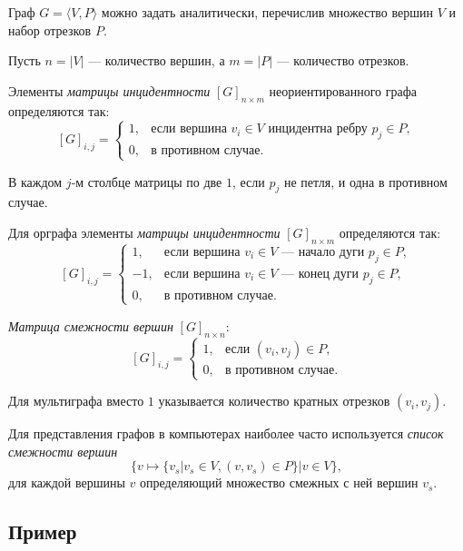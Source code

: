 Граф $G=\langle V,P\rangle$ можно задать аналитически, перечислив множество вершин $V$ и набор отрезков $P$.

Пусть $n=|V|$ --- количество вершин, а $m=|P|$ --- количество отрезков. 

Элементы \emph{матрицы инцидентности} $[G]_{n\times m}$ неориентированного графа определяются так:
\[
    [G]_{i,j}=
    \begin{cases}
        1, &\text{если вершина $v_i\in V$ инцидентна ребру $p_j\in P$},\\
        0, &\text{в противном случае.}
    \end{cases}
\]

В каждом $j$-м столбце матрицы по две $1$, если $p_j$ не петля, и одна в противном случае. 

Для орграфа элементы \emph{матрицы инцидентности} $[G]_{n\times m}$ определяются так:
\[
    [G]_{i,j}=
    \begin{cases}
         1, &\text{если вершина $v_i\in V$ --- начало дуги $p_j\in P$},\\
        -1, &\text{если вершина $v_i\in V$ --- конец дуги $p_j\in P$},\\
         0, &\text{в противном случае.}
    \end{cases}
\]

\emph{Матрица смежности вершин} $[G]_{n\times n}$:
\[
    [G]_{i,j}=
    \begin{cases}
         1, &\text{если $(v_i,v_j)\in P$},\\
         0, &\text{в противном случае.}
    \end{cases}
\]

Для мультиграфа вместо $1$ указывается количество кратных отрезков $(v_i,v_j)$.

Для представления графов в компьютерах наиболее часто используется \emph{список смежности вершин} 
\[
    \{v\mapsto \{v_s|v_s\in V,(v,v_s)\in P\}|v\in V\},
\]
для каждой вершины $v$ определяющий множество смежных с ней вершин $v_s$.

\subsection{Пример}

